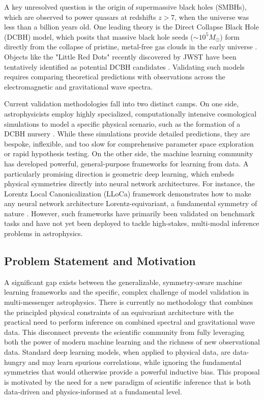\documentclass[11pt, a4paper]{article}
\begin{document}
A key unresolved question is the origin of supermassive black holes (SMBHs), which are observed to power quasars at redshifts $z > 7$, when the universe was less than a billion years old. One leading theory is the Direct Collapse Black Hole (DCBH) model, which posits that massive black hole seeds ($\sim 10^5 M_\odot$) form directly from the collapse of pristine, metal-free gas clouds in the early universe \cite{agarwal2013}. Objects like the "Little Red Dots" recently discovered by JWST have been tentatively identified as potential DCBH candidates \cite{greene2023}. Validating such models requires comparing theoretical predictions with observations across the electromagnetic and gravitational wave spectra.

Current validation methodologies fall into two distinct camps. On one side, astrophysicists employ highly specialized, computationally intensive cosmological simulations to model a specific physical scenario, such as the formation of a DCBH nursery \cite{paper2_sim}. While these simulations provide detailed predictions, they are bespoke, inflexible, and too slow for comprehensive parameter space exploration or rapid hypothesis testing. On the other side, the machine learning community has developed powerful, general-purpose frameworks for learning from data. A particularly promising direction is geometric deep learning, which embeds physical symmetries directly into neural network architectures. For instance, the Lorentz Local Canonicalization (LLoCa) framework demonstrates how to make any neural network architecture Lorentz-equivariant, a fundamental symmetry of nature \cite{paper1_lloca}. However, such frameworks have primarily been validated on benchmark tasks and have not yet been deployed to tackle high-stakes, multi-modal inference problems in astrophysics.

\subsection{Problem Statement and Motivation}
A significant gap exists between the generalizable, symmetry-aware machine learning frameworks and the specific, complex challenge of model validation in multi-messenger astrophysics. There is currently no methodology that combines the principled physical constraints of an equivariant architecture with the practical need to perform inference on combined spectral and gravitational wave data. This disconnect prevents the scientific community from fully leveraging both the power of modern machine learning and the richness of new observational data. Standard deep learning models, when applied to physical data, are data-hungry and may learn spurious correlations, while ignoring the fundamental symmetries that would otherwise provide a powerful inductive bias. This proposal is motivated by the need for a new paradigm of scientific inference that is both data-driven and physics-informed at a fundamental level.
\end{document}
